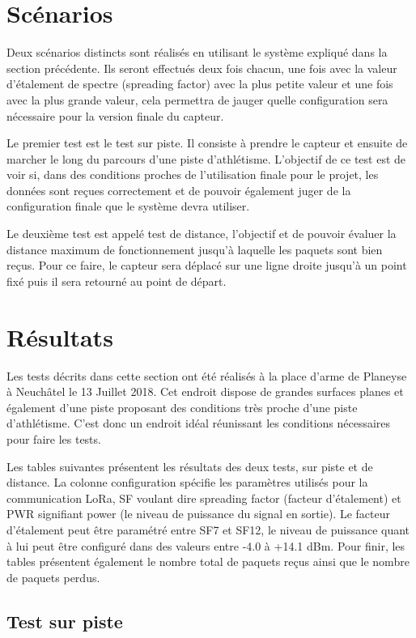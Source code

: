 \section{Scénarios}

Deux scénarios distincts sont réalisés en utilisant le système expliqué dans la section précédente. Ils seront effectués deux fois chacun, une fois avec la valeur d'étalement de spectre (spreading factor) avec la plus petite valeur et une fois avec la plus grande valeur, cela permettra de jauger quelle configuration sera nécessaire pour la version finale du capteur.

Le premier test est le test sur piste. Il consiste à prendre le capteur et ensuite de marcher le long du parcours d'une piste d'athlétisme. L'objectif de ce test est de voir si, dans des conditions proches de l'utilisation finale pour le projet, les données sont reçues correctement et de pouvoir également juger de la configuration finale que le système devra utiliser.

Le deuxième test est appelé test de distance, l'objectif et de pouvoir évaluer la distance maximum de fonctionnement jusqu'à laquelle les paquets sont bien reçus. Pour ce faire, le capteur sera déplacé sur une ligne droite jusqu'à un point fixé puis il sera retourné au point de départ.

\section{Résultats}

Les tests décrits dans cette section ont été réalisés à la place d'arme de Planeyse à Neuchâtel le 13 Juillet 2018. Cet endroit dispose de grandes surfaces planes et également d'une piste proposant des conditions très proche d'une piste d'athlétisme. C'est donc un endroit idéal réunissant les conditions nécessaires pour faire les tests.

Les  tables suivantes présentent les résultats des deux tests, sur piste et de distance. La colonne configuration spécifie les paramètres utilisés pour la communication LoRa, SF voulant dire spreading factor (facteur d'étalement) et PWR signifiant power (le niveau de puissance du signal en sortie).  Le facteur d'étalement peut être paramétré entre SF7 et SF12, le niveau de puissance quant à lui peut être configuré dans des valeurs entre -4.0 à +14.1 dBm.
Pour finir, les tables présentent également le nombre total de paquets reçus ainsi que le nombre de paquets perdus.

\subsection{Test sur piste}

